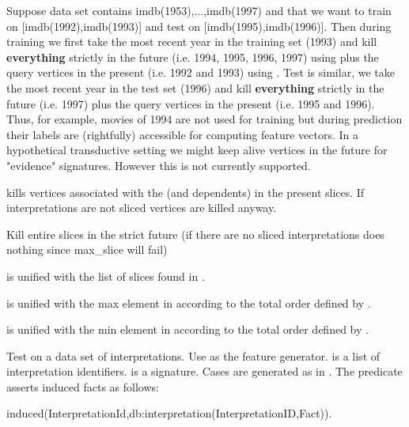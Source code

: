 \begin{description}
Suppose data set contains imdb(1953),...,imdb(1997) and that we want
to train on [imdb(1992),imdb(1993)] and test on
[imdb(1995),imdb(1996)]. Then during training we first take the most
recent year in the training set (1993) and kill \textbf{everything}
strictly in the future (i.e. 1994, 1995, 1996, 1997) using
 plus the query vertices in the present (i.e. 1992 and
1993) using . Test is similar, we take the most recent
year in the test set (1996) and kill \textbf{everything} strictly in the
future (i.e. 1997) plus the query vertices in the present (i.e. 1995
and 1996). Thus, for example, movies of 1994 are not used for
training but during prediction their labels are (rightfully)
accessible for computing feature vectors. In a hypothetical
transductive setting we might keep alive vertices in the future for
"evidence" signatures. However this is not currently supported.

 kills vertices associated with the 
(and dependents) in the present slices. If interpretations are not
sliced vertices are killed anyway.

Kill entire slices in the strict future (if there are no sliced
interpretations  does nothing since max_slice will
fail)

 is unified with the list of slices found in .

 is unified with the max element in  according to the total
order defined by .

 is unified with the min element in  according to the total
order defined by .

Test  on a data set of interpretations. Use  as the feature
generator.  is a list of interpretation identifiers.  is a
signature. Cases are generated as in . The predicate asserts
induced facts as follows:

\begin{code}
induced(InterpretationId,db:interpretation(InterpretationID,Fact)).
\end{code}


\end{description}
